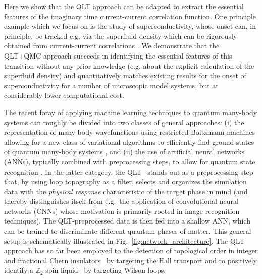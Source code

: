 \documentclass[amsmath,amssymb, aps, prx, longbibliography, twocolumn]{revtex4-1}
\begin{document}
Here we show that the QLT approach can be adapted to extract the essential features of the imaginary time current-current correlation function. %
One principle example which we focus on is the study of superconductivity, whose onset can, in principle, be tracked e.g. via the superfluid density which can be rigorously obtained from current-current correlations \cite{Scalapino1992,Scalapino1993}. 
We demonstrate that the QLT+QMC approach succeeds in identifying the essential features of this transition without any prior knowledge (e.g. about the explicit calculation of the superfluid density)
and quantitatively matches existing results for the onset of superconductivity for a number of microscopic model systems,
but at considerably lower computational cost.





The recent foray of applying machine learning techniques to quantum many-body systems can roughly be divided into two classes of general approaches: 
(i) the representation of many-body wavefunctions using restricted Boltzmann machines allowing for a new class of variational algorithms to efficiently find ground states of quantum many-body systems
\cite{Carleo2016, Deng2016, Deng2017, Glasser2018, Torlai2018, Gaoxun2017}, and 
(ii) the use of artificial neural networks (ANNs), typically combined with preprocessing steps, to allow for quantum state recognition 
\cite{Melko20161, Nieuwenburg2017, LeiWang2016, Simon2016, Kelvin2016, Ohtsuki2016, Ohtsuki2017, Titus2017, qlt2016, FrankMLZ2, Broecker2017, ZhaiHui2017, Iakovlev2018, PollmannML2018, Anna2018}.
%
In the latter category, the QLT~\cite{qlt2016} stands out as a preprocessing step that, by using loop topography as a filter,  selects and organizes the simulation data with the {\em physical response} characteristic of the target phase in mind (and thereby distinguishes itself from e.g.~the application of convolutional neural networks (CNNs) whose motivation is primarily rooted in image recognition techniques). 
The QLT-preprocessed data is then fed into a shallow ANN, which can be trained to discriminate different quantum phases of matter. This general setup is schematically illustrated in Fig.~\ref{fig:network_architecture}.
The QLT approach has so far been employed to the detection of topological order in integer and fractional Chern insulators~\cite{qlt2016} by targeting the Hall transport and to positively identify a $\mathbb{Z}_2$ spin liquid~\cite{Zhang2017} by targeting Wilson loops.
\end{document}
